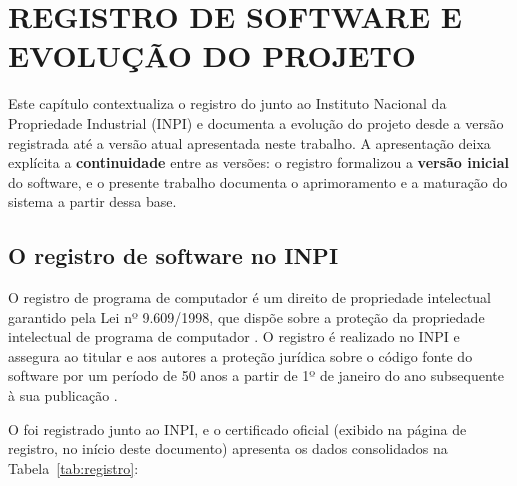 
\chapter{REGISTRO DE SOFTWARE E EVOLUÇÃO DO PROJETO}
\label{cap:registro-evolucao}

Este capítulo contextualiza o registro do \argus{} junto ao Instituto Nacional
da Propriedade Industrial (INPI) e documenta a evolução do projeto desde a
versão registrada até a versão atual apresentada neste trabalho. A apresentação
deixa explícita a \textbf{continuidade} entre as versões: o registro formalizou
a \textbf{versão inicial} do software, e o presente trabalho documenta o
aprimoramento e a maturação do sistema a partir dessa base.

\section{O registro de software no INPI}
\label{sec:registro-inpi}

O registro de programa de computador é um direito de propriedade intelectual
garantido pela Lei nº 9.609/1998, que dispõe sobre a proteção da propriedade
intelectual de programa de computador \cite{lei9609}. O registro é realizado no
INPI e assegura ao titular e aos autores a proteção jurídica sobre o código
fonte do software por um período de 50 anos a partir de 1º de janeiro do ano
subsequente à sua publicação \cite{inpi2026}.

O \argus{} foi registrado junto ao INPI, e o certificado oficial (exibido na
página de registro, no início deste documento) apresenta os dados
consolidados na Tabela~\ref{tab:registro}:

